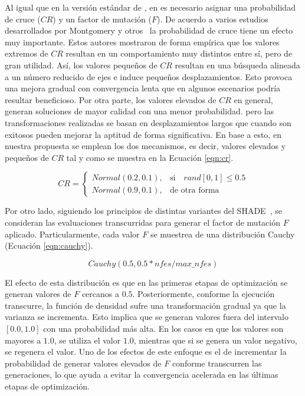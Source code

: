 Al igual que en la versión estándar de \DE{}, en \DEEDM{} es necesario asignar una probabilidad de cruce ($CR$) y un factor de mutación ($F$).
%
De acuerdo a varios estudios desarrollados por Montgomery y otros~\cite{montgomery2010analysis} la probabilidad de cruce tiene un efecto
muy importante.
%
Estos autores mostraron de forma empírica que los valores extremos de $CR$ resultan en un comportamiento muy distintos entre sí, pero de gran utilidad.
%
Así, los valores pequeños de $CR$ resultan en una búsqueda alineada a un número reducido de ejes e induce pequeños desplazamientos.
%
Esto provoca una mejora gradual con convergencia lenta que en algunos escenarios podría resultar beneficioso.
%
Por otra parte, los valores elevados de $CR$ en general, generan soluciones de mayor calidad con una menor probabilidad.
pero las transformaciones realizadas se basan en desplazamientos largos que cuando son exitosos pueden mejorar la aptitud 
de forma significativa.
%
En base a esto, en nuestra propuesta se emplean los dos mecanismos, es decir, valores elevados y pequeños de $CR$ tal y como se muestra
en la Ecuación \ref{eqn:cr}.

\begin{equation} \label{eqn:cr}
CR = 
\begin{cases}
     Normal(0.2, 0.1),& \text{si} \quad rand[0,1] \leq 0.5  \\
     Normal(0.9, 0.1),              & \text{de otra forma}
\end{cases}
\end{equation}

Por otro lado, siguiendo los principios de distintas variantes del SHADE~\cite{awad2016ensemble, brest2016shade}, se consideran las evaluaciones transcurridas
para generar el factor de mutación $F$ aplicado.
%
Particularmente, cada valor $F$ se muestrea de una distribución Cauchy (Ecuación \ref{eqn:cauchy}).

\begin{equation}\label{eqn:cauchy}
 Cauchy(0.5, 0.5*nfes/max\_nfes)
\end{equation}

El efecto de esta distribución es que en las primeras etapas de optimización se generan valores de $F$ cercanos a $0.5$.
%
Posteriormente, conforme la ejecución transcurre, la función de densidad sufre una transformación gradual ya que la varianza se incrementa.
%
Esto implica que se generan valores fuera del intervalo $[0.0, 1.0]$ con una probabilidad más alta.
%
En los casos en que los valores son mayores a $1.0$, se utiliza el valor $1.0$, mientras
que si se genera un valor negativo, se regenera el valor.
%
Uno de los efectos de este enfoque es el de incrementar la probabilidad de generar valores elevados de $F$ conforme transcurren las generaciones, lo que ayuda a evitar
la convergencia acelerada en las últimas etapas de optimización.



